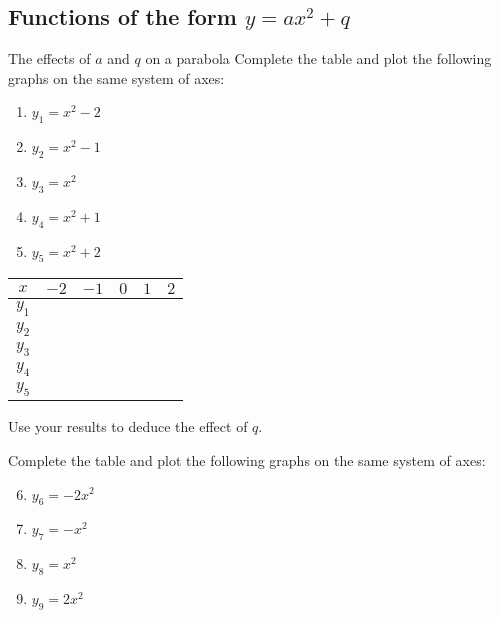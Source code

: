 \subsection*{Functions of the form $y=a{x}^{2}+q$}
\begin{Investigation}{The effects of $a$ and $q$ on a parabola}
Complete the table and plot the following graphs on the same system of axes:
    \begin{enumerate}[noitemsep, label=\textbf{\arabic*}. ] 
    \item $y_1={x}^{2}-2$
    \item $y_2={x}^{2}-1$
    \item $y_3={x}^{2}$
    \item $y_4={x}^{2}+1$
    \item $y_5={x}^{2}+2$
        \end{enumerate}

\begin{table}[H]
  \begin{center}
    \begin{tabular}{|c|c|c|c|c|c|}\hline
      $x$ & $-2$ & $-1$ & $0$ & $1$ & $2$ \\ \hline
      $y_1$ & \hspace{1cm}  & \hspace{1cm}  & \hspace{1cm}  & \hspace{1cm}  & \hspace{1cm}  \\ \hline
      $y_2$ & & & & & \\ \hline
      $y_3$ & & & & & \\ \hline
      $y_4$ & & & & & \\ \hline
      $y_5$ & & & & & \\ \hline
    \end{tabular}
  \end{center}
\end{table}
Use your results to deduce the effect of $q$.

Complete the table and plot the following graphs on the same system of axes:
\begin{enumerate}[noitemsep, label=\textbf{\arabic*}. ] \setcounter{enumi}{5}
\item $y_6=-2{x}^{2}$
\item $y_7=-{x}^{2}$
\item $y_8={x}^{2}$
\item $y_9=2{x}^{2}$
\end{enumerate}


\end{Investigation}
